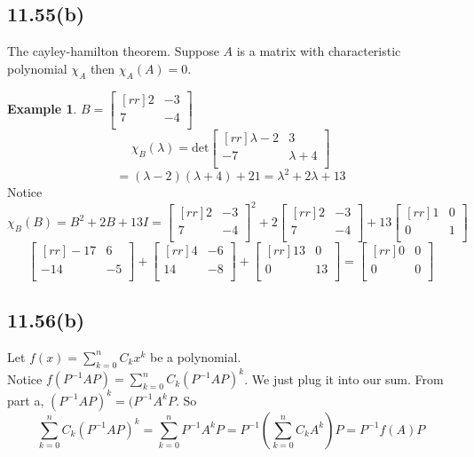 \documentclass{report}
\theoremstyle{plain}
\theoremstyle{definition}
\newtheorem*{ex}{Example}
\theoremstyle{plain}
\begin{document}
\subsection{11.55(b)}
The cayley-hamilton theorem. Suppose $A$ is a matrix with characteristic polynomial $\chi_A$ then $\chi_A(A)=0$.\\
\begin{ex}
$B=\begin{bmatrix}[rr]2&-3\\7&-4\\\end{bmatrix}$
\[ \chi_B(\lambda )=\mathrm{det}\begin{bmatrix}[rr]\lambda -2&3\\-7&\lambda + 4\\\end{bmatrix} \]
\[ =(\lambda - 2)(\lambda + 4)+21=\lambda^2+2\lambda + 13 \]
Notice $\chi_B(B)=B^2+2B+13I = \begin{bmatrix}[rr]2&-3\\7&-4\\\end{bmatrix}^2+2\begin{bmatrix}[rr]2&-3\\7&-4\\\end{bmatrix}+13\begin{bmatrix}[rr]1&0\\0&1\\\end{bmatrix}$
\[ \begin{bmatrix}[rr]-17&6\\-14&-5\\\end{bmatrix}+\begin{bmatrix}[rr]4&-6\\14&-8\\\end{bmatrix}+\begin{bmatrix}[rr]13&0\\0&13\\\end{bmatrix}=\begin{bmatrix}[rr]0&0\\0&0\\\end{bmatrix} \]
\subsection{11.56(b)}
Let $f(x)=\sum_{k=0}^nC_kx^k$ be a polynomial.\\
Notice $f(P^{-1}AP)=\sum_{k=0}^nC_k(P^{-1}AP)^k$. We just plug it into our sum. From part a, $(P^{-1}AP)^k=(P^{-1}A^kP$. So
\[ \sum_{k=0}^nC_k(P^{-1}AP)^k = \sum_{k=0}^nP^{-1}A^kP=P^{-1}(\sum_{k=0}^nC_kA^k)P = P^{-1}f(A)P \]

\end{ex}
\end{document}
